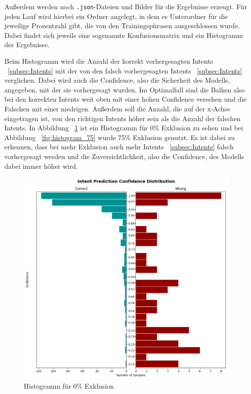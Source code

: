 Außerdem werden noch \texttt{.json}-Dateien und Bilder für die Ergebnisse erzeugt.
Für jeden Lauf wird hierbei ein Ordner angelegt, in dem es Unterordner für die jeweilige Prozentzahl gibt, die von den Trainingsphrasen ausgeschlossen wurde.
Dabei findet sich jeweils eine sogenannte Konfusionsmatrix und ein Histogramm der Ergebnisse.

Beim Histogramm wird die Anzahl der korrekt vorhergesagten Intents ~\ref{subsec:Intents} mit der von den falsch vorhergesagten Intents ~\ref{subsec:Intents} verglichen.
Dabei wird auch die Confidence, also die Sicherheit des Modells, angegeben, mit der sie vorhergesagt wurden.
Im Optimalfall sind die Balken also bei den korrekten Intents weit oben mit einer hohen Confidence versehen und die Falschen mit einer niedrigen.
Außerdem soll die Anzahl, die auf der x-Achse eingetragen ist, von den richtigen Intents höher sein als die Anzahl der falschen Intents.
In Abbildung ~\ref{fig:histogram_0} ist ein Histogramm für 0\% Exklusion zu sehen und bei Abbildung ~\ref{fig:histogram_75} wurde 75\% Exklusion genutzt.
Es ist dabei zu erkennen, dass bei mehr Exklusion auch mehr Intents ~\ref{subsec:Intents} falsch vorhergesagt werden und die Zuversichtlichkeit, also die Confidence, des Modells dabei immer höher wird.

\begin{figure}[hbt!]
    \centering
    \includegraphics[scale=0.6]{pics/intent_histogram_0}
    \caption{Histogramm für 0\% Exklusion}
    \label{fig:histogram_0}
\end{figure}

